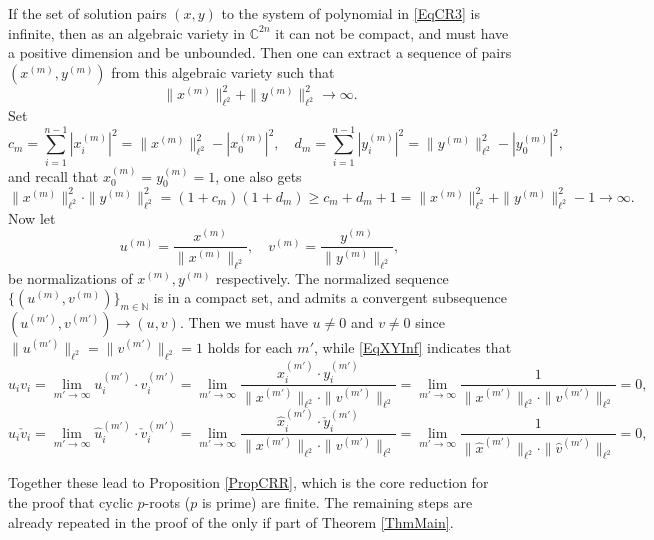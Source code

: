 \documentclass[A4,11pt]{article}
\newcommand{\norm}[1]{\|#1\|_{\ell^2}}
\begin{document}
If the set of solution pairs $(x,y)$ to the system of polynomial in \eqref{EqCR3} is infinite, then as an algebraic variety in $\mathbb C^{2n}$ it can not be compact, and must have a positive dimension and be unbounded. Then one can extract a sequence of pairs $(x^{(m)}, y^{(m)})$ from this algebraic variety such that 
$$\norm{x^{(m)}}^{2}+\norm{y^{(m)}}^{2}\to\infty.$$
Set 
$$c_m=\sum_{i=1}^{n-1}|x_i^{(m)}|^2=\norm{x^{(m)}}^{2}-|x_0^{(m)}|^2, \quad d_m=\sum_{i=1}^{n-1}|y_i^{(m)}|^2=\norm{y^{(m)}}^{2}-|y_0^{(m)}|^2,$$
and recall that $x_0^{(m)}=y_0^{(m)}=1$, one also gets
\begin{equation} \label{EqXYInf}
\norm{x^{(m)}}^{2}\cdot\norm{y^{(m)}}^{2}=(1+c_m)(1+d_m)\ge c_m+d_m+1=\norm{x^{(m)}}^{2}+\norm{y^{(m)}}^{2}-1\to\infty.
\end{equation} 
Now let
$$u^{(m)}=\frac{x^{(m)}}{\norm{x^{(m)}}}, \quad v^{(m)}=\frac{y^{(m)}}{\norm{y^{(m)}}},$$
be normalizations of $x^{(m)},y^{(m)}$ respectively. The normalized sequence $\{(u^{(m)},v^{(m)})\}_{m\in\mathbb N}$ is in a compact set, and admits a convergent subsequence $(u^{(m')},v^{(m')})\to(u,v)$. Then we must have $u\neq 0$ and $v\neq 0$ since $\norm{u^{(m')}}=\norm{v^{(m')}}=1$ holds for each $m'$, while \eqref{EqXYInf} indicates that
$$u_iv_i=\lim_{m'\to\infty} u_i^{(m')}\cdot v_i^{(m')}=\lim_{m'\to\infty} \frac{x_i^{(m')}\cdot y_i^{(m')}}{\norm{x^{(m')}}\cdot \norm{v^{(m')}}}=\lim_{m'\to\infty} \frac{1}{\norm{x^{(m')}}\cdot \norm{v^{(m')}}}=0,$$
$$\hat u_i\check v_{i}=\lim_{m'\to\infty} \hat u_i^{(m')}\cdot \check v_{i}^{(m')}=\lim_{m'\to\infty} \frac{\hat x_i^{(m')}\cdot \check y_{i}^{(m')}}{\norm{x^{(m')}}\cdot \norm{v^{(m')}}}=\lim_{m'\to\infty} \frac{1}{\norm{\hat x^{(m')}}\cdot \norm{\hat v^{(m')}}}=0,$$

Together these lead to Proposition \ref{PropCRR}, which is the core reduction for the proof that cyclic $p$-roots ($p$ is prime) are finite. The remaining steps are already repeated in the proof of the only if part of Theorem \ref{ThmMain}.
\end{document}
